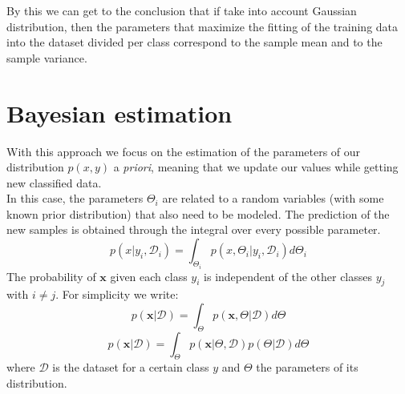     	By this we can get to the conclusion that if take into account Gaussian distribution, then the parameters that maximize the fitting of the training data into the dataset divided per class correspond to the sample mean and to the sample variance.
    	
    	
\section{Bayesian estimation}
    \label{par:Bayesian_estimation}
    With this approach we focus on the estimation of the parameters of our distribution $p(x, y)$ a \textit{priori}, meaning that we update our values while getting new classified data.\\
    In this case, the parameters $\Theta_i$ are related to a random variables (with some known prior distribution) that also need to be modeled. The prediction of the new samples is obtained through the integral over every possible parameter.
    $$p(x|y_i, \mathcal{D}_i) = \int_{\Theta_i} p(x, \Theta_i|y_i, \mathcal{D}_i) d\Theta_i$$
    The probability of $\pmb{x}$ given each class $y_i$ is independent of the other classes $y_j$ with $i \neq j$. For simplicity we write:
    $$p(\pmb{x}|\mathcal{D}) = \int_{\Theta} p(\pmb{x}, \Theta|\mathcal{D}) d\Theta$$
    $$p(\pmb{x}|\mathcal{D}) = \int_{\Theta} p(\pmb{x} |\Theta,\mathcal{D}) p(\Theta | \mathcal{D}) d\Theta$$ 
    where $\mathcal{D}$ is the dataset for a certain class $y$ and $\Theta$ the parameters of its distribution.\\
    
